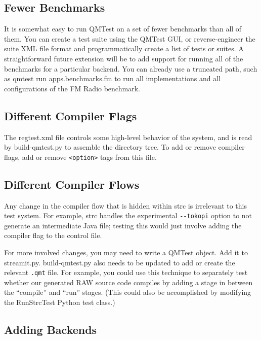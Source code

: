 \documentclass[11pt]{article}
\begin{document}
\subsection{Fewer Benchmarks}

It is somewhat easy to run QMTest on a set of fewer benchmarks than
all of them.  You can create a test suite using the QMTest GUI, or
reverse-engineer the suite XML file format and programmatically create
a list of tests or suites.  A straightforward future extension will be
to add support for running all of the benchmarks for a particular
backend.  You can already use a truncated path, such as \textsf{qmtest
  run apps.benchmarks.fm} to run all implementations and all
configurations of the FM Radio benchmark.

\subsection{Different Compiler Flags}

The \textsf{regtest.xml} file controls some high-level behavior of the
system, and is read by \textsf{build-qmtest.py} to assemble the
directory tree.  To add or remove compiler flags, add or remove
\verb|<option>| tags from this file.

\subsection{Different Compiler Flows}

Any change in the compiler flow that is hidden within \textsf{strc} is
irrelevant to this test system.  For example, \textsf{strc} handles
the experimental \verb|--tokopi| option to not generate an
intermediate Java file; testing this would just involve adding the
compiler flag to the control file.

For more involved changes, you may need to write a QMTest object.  Add
it to \textsf{streamit.py}.  \textsf{build-qmtest.py} also needs to be
updated to add or create the relevant \texttt{.qmt} file.  For
example, you could use this technique to separately test whether our
generated RAW source code compiles by adding a stage in between the
``compile'' and ``run'' stages.  (This could also be accomplished by
modifying the \textsf{RunStrcTest} Python test class.)

\subsection{Adding Backends}
\end{document}
